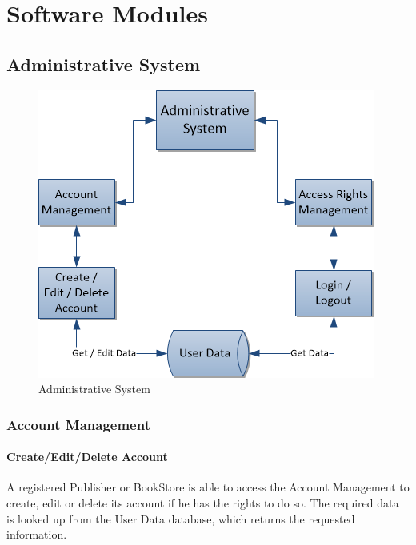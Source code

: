 \documentclass[11pt,a4paper,oneside,svgnames]{report}
\begin{document}
\chapter{Software Modules}
\label{sec:modules}
\section{Administrative System}

\begin{figure}[H]
 \begin{center}
  \includegraphics[width=\textwidth]{AdministrativeSystem.png}
 \end{center}
 \caption{Administrative System}
\end{figure}

\subsection{Account Management}

\subsubsection{Create/Edit/Delete Account}

A registered Publisher or BookStore is able to access the Account Management to create, edit or delete its account if he has the rights to do so. The required data is looked up from the User Data database, which returns the requested information.
\end{document}
